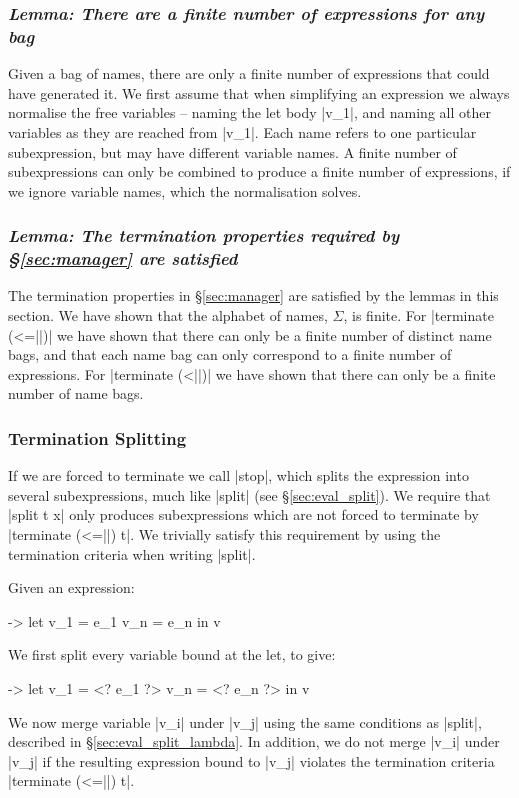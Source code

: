 \documentclass[draft]{sigplanconf}
\newcommand{\lemma}[1]{\subsubsection*{\textit{Lemma: #1}}}
\begin{document}
\lemma{There are a finite number of expressions for any bag}

Given a bag of names, there are only a finite number of expressions that could have generated it. We first assume that when simplifying an expression we always normalise the free variables -- naming the let body |v_1|, and naming all other variables as they are reached from |v_1|. Each name refers to one particular subexpression, but may have different variable names. A finite number of subexpressions can only be combined to produce a finite number of expressions, if we ignore variable names, which the normalisation solves.

\lemma{The termination properties required by \S\ref{sec:manager} are satisfied}

The termination properties in \S\ref{sec:manager} are satisfied by the lemmas in this section. We have shown that the alphabet of names, $\Sigma$, is finite. For |terminate (<=||)| we have shown that there can only be a finite number of distinct name bags, and that each name bag can only correspond to a finite number of expressions. For |terminate (<||)| we have shown that there can only be a finite number of name bags.

\subsubsection{Termination Splitting}
\label{sec:term_split}

If we are forced to terminate we call |stop|, which splits the expression into several subexpressions, much like |split| (see \S\ref{sec:eval_split}). We require that |split t x| only produces subexpressions which are not forced to terminate by |terminate (<=||) t|. We trivially satisfy this requirement by using the termination criteria when writing |split|.

Given an expression:

\begin{code}
\free ->  let  v_1 = e_1
               v_n = e_n
          in   v
\end{code}

We first split every variable bound at the let, to give:

\begin{code}
\free ->  let  v_1 = <? e_1 ?>
               v_n = <? e_n ?>
          in   v
\end{code}

We now merge variable |v_i| under |v_j| using the same conditions as |split|, described in \S\ref{sec:eval_split_lambda}. In addition, we do not merge |v_i| under |v_j| if the resulting expression bound to |v_j| violates the termination criteria |terminate (<=||) t|.
\end{document}
